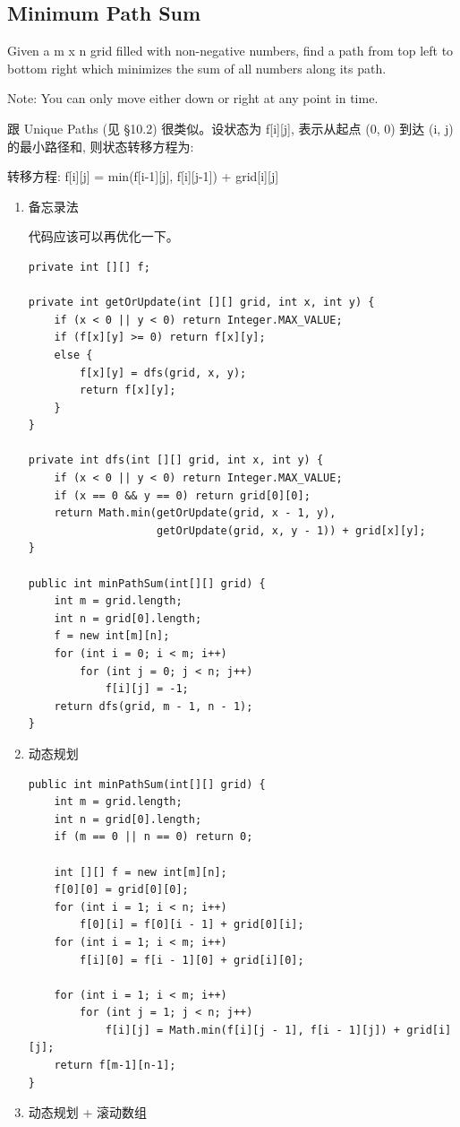 \documentclass[12pt]{book}
\begin{document}
\subsection{Minimum Path Sum}
\label{sec-14-2-3}
Given a m x n grid filled with non-negative numbers, find a path from top left to bottom right which minimizes the sum of all numbers along its path.

Note: You can only move either down or right at any point in time.

跟 Unique Paths (见 §10.2) 很类似。设状态为 f[i][j], 表示从起点 (0, 0) 到达 (i, j) 的最小路径和, 则状态转移方程为: 

转移方程: f[i][j] = min(f[i-1][j], f[i][j-1]) + grid[i][j]
\begin{enumerate}
\item 备忘录法
\label{sec-14-2-3-1}

代码应该可以再优化一下。
\lstset{language=java,label= ,caption= ,numbers=none}
\begin{lstlisting}
private int [][] f;

private int getOrUpdate(int [][] grid, int x, int y) {
    if (x < 0 || y < 0) return Integer.MAX_VALUE;
    if (f[x][y] >= 0) return f[x][y];
    else {
        f[x][y] = dfs(grid, x, y);
        return f[x][y];
    }
}
        
private int dfs(int [][] grid, int x, int y) {
    if (x < 0 || y < 0) return Integer.MAX_VALUE;
    if (x == 0 && y == 0) return grid[0][0];
    return Math.min(getOrUpdate(grid, x - 1, y),
                    getOrUpdate(grid, x, y - 1)) + grid[x][y];
}

public int minPathSum(int[][] grid) {
    int m = grid.length;
    int n = grid[0].length;
    f = new int[m][n];
    for (int i = 0; i < m; i++) 
        for (int j = 0; j < n; j++) 
            f[i][j] = -1;
    return dfs(grid, m - 1, n - 1);
}
\end{lstlisting}
\item 动态规划
\label{sec-14-2-3-2}
\lstset{language=java,label= ,caption= ,numbers=none}
\begin{lstlisting}
public int minPathSum(int[][] grid) {
    int m = grid.length;
    int n = grid[0].length;
    if (m == 0 || n == 0) return 0;
            
    int [][] f = new int[m][n];
    f[0][0] = grid[0][0];
    for (int i = 1; i < n; i++)
        f[0][i] = f[0][i - 1] + grid[0][i];
    for (int i = 1; i < m; i++)
        f[i][0] = f[i - 1][0] + grid[i][0];
            
    for (int i = 1; i < m; i++) 
        for (int j = 1; j < n; j++) 
            f[i][j] = Math.min(f[i][j - 1], f[i - 1][j]) + grid[i][j];
    return f[m-1][n-1];
}
\end{lstlisting}
\item 动态规划 + 滚动数组
\label{sec-14-2-3-3}
\end{enumerate}
\end{document}
